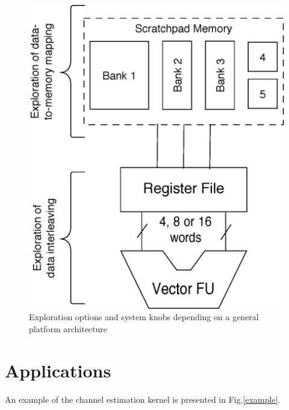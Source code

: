 \documentclass[runningheads,a4paper]{llncs}
\begin{document}
\begin{figure}
\centering
	\label{arch}
	\caption{Exploration options and system knobs depending on a general platform architecture}
	\includegraphics[width=\textwidth]{Images/Architecture.eps} 
\end{figure}

\section{Applications}

An example of the channel estimation kernel is presented in Fig.\ref{example}.
\end{document}
